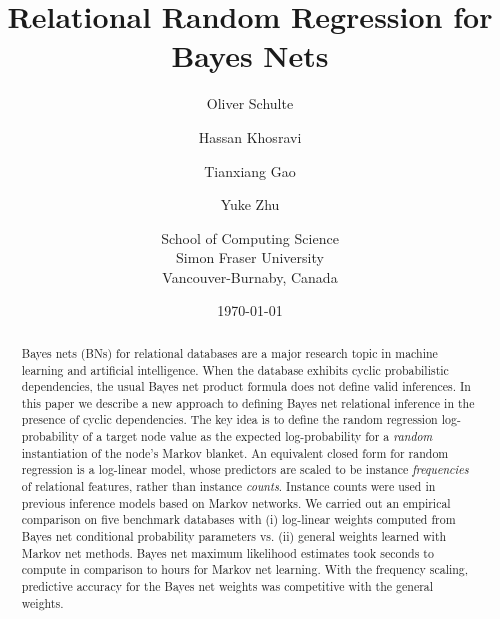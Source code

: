 \documentclass[twoside,leqno,twocolumn]{article}
\title{Relational Random Regression for Bayes Nets}
\author{Oliver Schulte \and Hassan Khosravi \and Tianxiang Gao \and Yuke Zhu \\
\and 
School of Computing Science\\ Simon Fraser University\\Vancouver-Burnaby, Canada}
\begin{document}
\date{\today}
\maketitle

\begin{abstract} Bayes nets (BNs) for relational databases are a major research topic in machine learning and artificial intelligence. When the database exhibits cyclic probabilistic dependencies, the usual Bayes net product formula does not define valid inferences. In this paper we describe a new approach to defining Bayes net relational inference in the presence of cyclic dependencies. The key idea is to define the random regression log-probability of a target node value  as the expected log-probability for a {\em random} instantiation of the node's Markov blanket. An equivalent closed form  for random regression is a log-linear model, whose predictors are scaled to be instance {\em frequencies} of relational features, rather than instance {\em counts}. Instance counts were used in previous inference models based on Markov networks. We carried out an empirical comparison on five benchmark databases with (i) log-linear weights computed from Bayes net conditional probability parameters vs. (ii) general weights learned with Markov net methods. Bayes net maximum likelihood estimates took seconds to compute  in comparison to hours for Markov net learning. With the frequency scaling, predictive accuracy for the Bayes net weights was competitive with the general weights.
\end{abstract}
 
 
\end{document}
